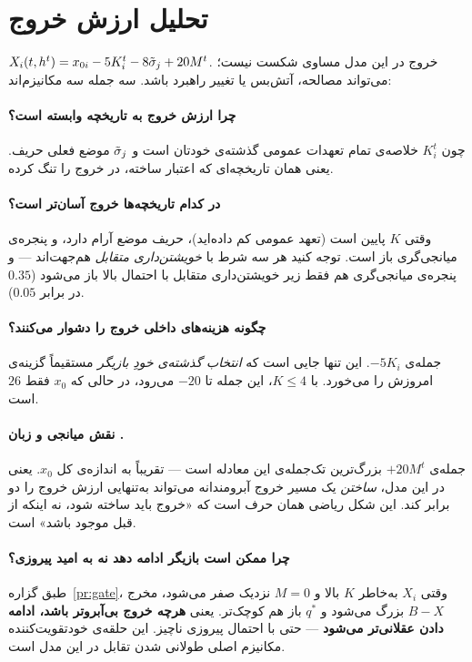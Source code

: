 \documentclass[12pt,a4paper]{article}
\begin{document}
\section{تحلیل ارزش خروج}\label{sec:exitval}

$X_i(t,h^t)=x_{0i}-5K_i^t-8\tilde{\sigma}_j+20M^t$. خروج در این مدل مساوی شکست
نیست؛ می‌تواند مصالحه، آتش‌بس یا تغییر راهبرد باشد. سه جمله سه مکانیزم‌اند:

\paragraph{چرا ارزش خروج به تاریخچه وابسته است؟}
چون $K_i^t$ خلاصه‌ی تمام تعهدات عمومی گذشته‌ی خودتان است و $\tilde{\sigma}_j$
موضع فعلی حریف. یعنی همان تاریخچه‌ای که اعتبار ساخته، در خروج را تنگ کرده.

\paragraph{در کدام تاریخچه‌ها خروج آسان‌تر است؟}
وقتی $K$ پایین است (تعهد عمومی کم داده‌اید)، حریف موضع آرام دارد، و پنجره‌ی
میانجی‌گری باز است. توجه کنید هر سه شرط با \emph{خویشتن‌داری متقابل} هم‌جهت‌اند
— و پنجره‌ی میانجی‌گری هم فقط زیر خویشتن‌داری متقابل با احتمال بالا باز
می‌شود ($0.35$ در برابر $0.05$).

\paragraph{چگونه هزینه‌های داخلی خروج را دشوار می‌کنند؟}
جمله‌ی $-5K_i$. این تنها جایی است که \emph{انتخاب گذشته‌ی خودِ بازیگر}
مستقیماً گزینه‌ی امروزش را می‌خورد. با $K\le4$، این جمله تا $-20$ می‌رود، در
حالی که $x_0$ فقط $26$ است.

\paragraph{نقش میانجی و زبان .}
جمله‌ی $+20M^t$ بزرگ‌ترین تک‌جمله‌ی این معادله است — تقریباً به اندازه‌ی کل
$x_0$. یعنی در این مدل، \emph{ساختن} یک مسیر خروج آبرومندانه می‌تواند به‌تنهایی
ارزش خروج را دو برابر کند. این شکل ریاضی همان حرف است که «خروج باید ساخته شود، نه اینکه از
قبل موجود باشد» است.

\paragraph{چرا ممکن است بازیگر ادامه دهد نه به امید پیروزی؟}
طبق گزاره~\ref{pr:gate}، وقتی $X_i$ به‌خاطر $K$ بالا و $M=0$ نزدیک صفر
می‌شود، مخرج $B-X$ بزرگ می‌شود و $q^\ast$ باز هم کوچک‌تر. یعنی
\textbf{هرچه خروج بی‌آبروتر باشد، ادامه دادن عقلانی‌تر می‌شود} — حتی با
احتمال پیروزی ناچیز. این حلقه‌ی خودتقویت‌کننده مکانیزم اصلی طولانی شدن
تقابل در این مدل است.
\end{document}
